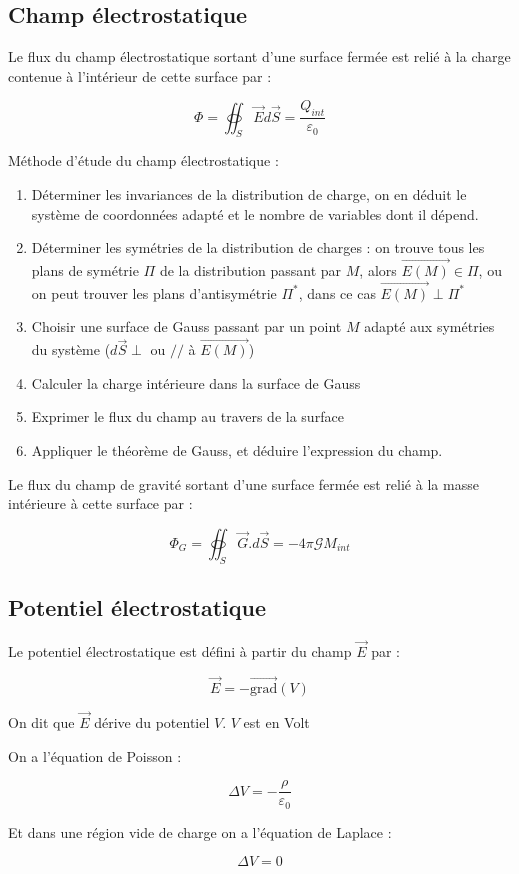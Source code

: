 \documentclass[a4paper,12pt]{book}
\newcommand{\Def}[2]{\begin{tcolorbox}[colback=white,colframe=red!10!green!20!blue!75!, title=Définition : #1]#2\end{tcolorbox}}
\newcommand{\Thr}[2]{\begin{tcolorbox}[sharp corners, colback=white,colframe=red!10!blue!30!green!75!, title=Théorème : #1]#2\end{tcolorbox}}
\newcommand{\Grad}{\overrightarrow{\mathrm{grad}}}
\renewcommand{\Vec}[1]{\overrightarrow{#1}}
\begin{document}
\subsection{Champ électrostatique}
\Thr{Théorème de Gauss}{Le flux du champ électrostatique sortant d'une surface fermée est relié à la charge contenue à l'intérieur de cette surface par :
\par $$\Phi = \oiint_S\Vec{E}d\Vec{S} = \frac{Q_{int}}{\varepsilon_0}$$}
Méthode d'étude du champ électrostatique :\begin{enumerate}
\item Déterminer les invariances de la distribution de charge, on en déduit le système de coordonnées adapté et le nombre de variables dont il dépend.
\item Déterminer les symétries de la distribution de charges : on trouve tous les plans de symétrie $\Pi$ de la distribution passant par $M$, alors $\Vec{E(M)}\in \Pi$, ou on peut trouver les plans d'antisymétrie $\Pi^*$, dans ce cas $\Vec{E(M)}\perp\Pi^*$
\item Choisir une surface de Gauss passant par un point $M$ adapté aux symétries du système ($d\Vec{S}\perp$ ou $//$ à $\Vec{E(M)}$)
\item Calculer la charge intérieure dans la surface de Gauss
\item Exprimer le flux du champ au travers de la surface
\item Appliquer le théorème de Gauss, et déduire l'expression du champ.
\end{enumerate}
\Thr{Théorème de Gauss gravitationnel}{Le flux du champ de gravité sortant d'une surface fermée est relié à la masse intérieure à cette surface par :
\par $$\Phi_G = \oiint_S\Vec{G}.d\Vec{S} = -4\pi\mathcal{G}M_{int}$$}

\subsection{Potentiel électrostatique}
\Def{}{Le potentiel électrostatique est défini à partir du champ $\Vec{E}$ par :
\par $$\Vec{E} = -\Grad(V)$$
\par On dit que $\Vec{E}$ dérive du potentiel $V$. $V$ est en Volt}
\Thr{}{On a l'équation de Poisson :
\par $$\Delta V = -\frac{\rho}{\varepsilon_0}$$
\par Et dans une région vide de charge on a l'équation de Laplace :
\par $$\Delta V =0$$}
\end{document}
